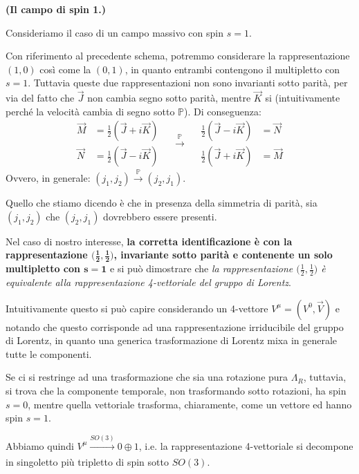 \documentclass[../main.tex]{subfiles}
\begin{document}
\begin{example}
    \textbf{(Il campo di spin 1.)}

    Consideriamo il caso di un campo massivo con spin $s=1$. 

    Con riferimento al precedente schema, potremmo considerare la rappresentazione $(1,0)$ così come la $(0,1)$, in quanto entrambi contengono il multipletto con $s=1$. Tuttavia queste due rappresentazioni non sono invarianti sotto parità, per via del fatto che $\Vec{J}$ non cambia segno sotto parità, mentre $\Vec{K}$ si (intuitivamente perché la velocità cambia di segno sotto $\mathbb P$). Di conseguenza:
    \[
    \begin{aligned}
        \Vec{M} &= \frac{1}{2}(\Vec{J}+i\Vec{K}) \\
        \Vec{N} &= \frac{1}{2}(\Vec{J}-i\Vec{K})   
    \end{aligned}
    \quad
    \xrightarrow{\mathbb P}
    \quad
    \begin{aligned}
        \frac{1}{2}(\Vec{J}-i\Vec{K}) &= \Vec{N}\\
        \frac{1}{2}(\Vec{J}+i\Vec{K}) &= \Vec{M}   
    \end{aligned}
    \]
    Ovvero, in generale: $\boxed{(j_1,j_2)\xrightarrow{\mathbb P}(j_2,j_1)}$.

    Quello che stiamo dicendo è che in presenza della simmetria di parità, sia $(j_1,j_2)$ che $(j_2,j_1)$ dovrebbero essere presenti.

    Nel caso di nostro interesse, \textbf{la corretta identificazione è con la rappresentazione $\mathbf{\big(\frac{1}{2},\frac{1}{2}\big)}$, invariante sotto parità e contenente un solo multipletto con $\mathbf{s=1}$} e si può dimostrare che \textit{la rappresentazione ${\big(\frac{1}{2},\frac{1}{2}\big)}$ è equivalente alla rappresentazione 4-vettoriale del gruppo di Lorentz}.

    Intuitivamente questo si può capire considerando un 4-vettore $V^\mu = (V^0,\Vec{V})$ e notando che questo corrisponde ad una rappresentazione irriducibile del gruppo di Lorentz, in quanto una generica trasformazione di Lorentz mixa in generale tutte le componenti. 

    Se ci si restringe ad una trasformazione che sia una rotazione pura $\Lambda_R$, tuttavia, si trova che la componente temporale, non trasformando sotto rotazioni, ha spin $s=0$, mentre quella vettoriale trasforma, chiaramente, come un vettore ed hanno spin $s=1$.

    Abbiamo quindi \(V^\mu \xrightarrow[]{SO(3)}0\oplus1\), i.e. la rappresentazione 4-vettoriale si decompone in singoletto più tripletto di spin sotto $SO(3)$.
\end{example}
\end{document}
